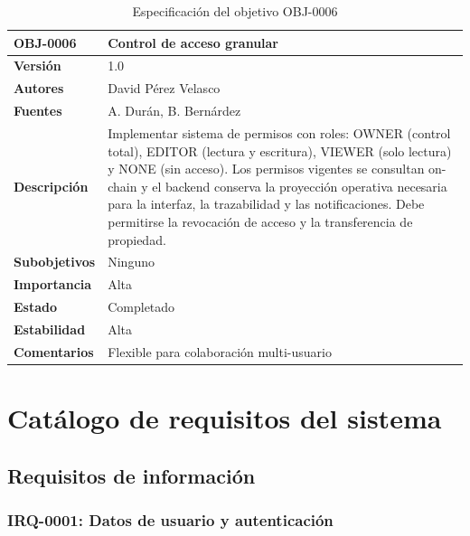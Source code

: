 \documentclass[11pt, a4paper]{article}
\begin{document}
\begin{table}[H]
    \centering
    \small
    \begin{tabular}{|p{4cm}|p{10cm}|}
    \hline
    \textbf{OBJ-0006} & Control de acceso granular \\
    \hline
    \textbf{Versión} & 1.0 \\
    \hline
    \textbf{Autores} & David Pérez Velasco \\
    \hline
    \textbf{Fuentes} & A. Durán, B. Bernárdez \\
    \hline
    \textbf{Descripción} & Implementar sistema de permisos con roles: OWNER (control total), EDITOR (lectura y escritura), VIEWER (solo lectura) y NONE (sin acceso). Los permisos vigentes se consultan on-chain y el backend conserva la proyección operativa necesaria para la interfaz, la trazabilidad y las notificaciones. Debe permitirse la revocación de acceso y la transferencia de propiedad. \\
    \hline
    \textbf{Subobjetivos} & Ninguno \\
    \hline
    \textbf{Importancia} & Alta \\
    \hline
    \textbf{Estado} & Completado \\
    \hline
    \textbf{Estabilidad} & Alta \\
    \hline
    \textbf{Comentarios} & Flexible para colaboración multi-usuario \\
    \hline
    \end{tabular}
    \caption{Especificación del objetivo OBJ-0006}
\end{table}

\section{Catálogo de requisitos del sistema}

\subsection{Requisitos de información}

\subsubsection{IRQ-0001: Datos de usuario y autenticación}
\end{document}
